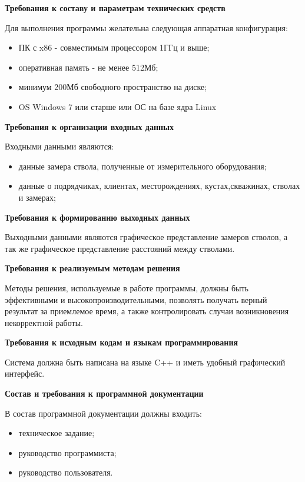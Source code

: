 \textbf{Требования к составу и параметрам технических средств}

Для выполнения программы желательна следующая аппаратная конфигурация:

\begin{itemize}
  \item ПК с x86 - совместимым процессором 1ГГц и выше;
  \item оперативная память - не менее 512Мб;
  \item минимум 200Мб свободного пространство на диске;
  \item OS Windows 7 или старше или ОС на базе ядра Linux
\end{itemize}

\textbf{Требования к организации входных данных}

Входными данными являются:
\begin{itemize}
  \item данные замера ствола, полученные от измерительного оборудования;
  \item данные о подрядчиках, клиентах, месторождениях, кустах,скважинах, стволах и замерах;
\end{itemize}

\textbf{Требования к формированию выходных данных}

Выходными данными являются графическое представление замеров стволов, а так же графическое представление расстояний
между стволами.

\textbf{Требования к реализуемым методам решения}

Методы решения, используемые в работе программы, должны быть эффективными и высокопроизводительными,
позволять получать верный результат за приемлемое время, а также контролировать случаи возникновения некорректной работы.

\textbf{Требования к исходным кодам и языкам программирования}

Система должна быть написана на языке C++ и иметь удобный графический интерфейс.

\textbf{Состав и требования к программной документации}

В состав программной документации должны входить:
\begin{itemize}
  \item техническое задание;
  \item руководство программиста;
  \item руководство пользователя.
\end{itemize}
